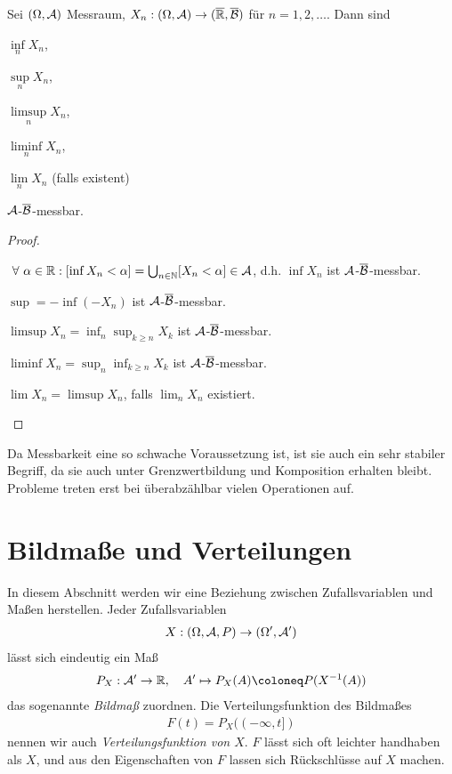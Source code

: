 \begin{prop}
\label{prop:3.7}
Sei  $(\Omega, \AA)$ Messraum, $X_{n} : (\Omega, \AA) \to
(\overline{\R}, \overline{\BB})$ für $n= 1,2, \ldots$.
Dann sind
\begin{defnpropenum}
  \item $\inf\limits_{n} X_{n}$,
  \item $\sup\limits_{n} X_{n}$,
  \item $\limsup\limits_{n} X_{n}$,
  \item $\liminf \limits_{n} X_{n}$,
  \item $\lim\limits_{n} X_{n}$ (falls existent)
\end{defnpropenum}
$\AA$-$\overline{\BB}$-messbar.\fishhere
\end{prop}
\begin{proof}
\begin{proofenumarabicbr}
  \item $\forall\alpha\in\R : [\inf X_n < \alpha] = \bigcup_{n\in\N} [X_n <
  \alpha] \in \AA$, d.h. $\inf X_n$ ist $\AA$-$\overline{\BB}$-messbar.
  \item $\sup=-\inf(-X_n)$ ist $\AA$-$\overline{\BB}$-messbar.
  \item $\limsup X_n = \inf_n \sup_{k\ge n} X_k$ 
 ist $\AA$-$\overline{\BB}$-messbar.
 \item $\liminf X_n = \sup_n \inf_{k\ge n} X_k$ ist
 $\AA$-$\overline{\BB}$-messbar.
 \item $\lim X_n = \limsup X_n$, falls $\lim_n X_n$ existiert.\qedhere
\end{proofenumarabicbr}
\end{proof}

Da Messbarkeit eine so schwache Voraussetzung ist, ist sie auch ein sehr
stabiler Begriff, da sie auch unter Grenzwertbildung und Komposition erhalten
bleibt. Probleme treten erst bei überabzählbar vielen Operationen auf.

\clearpage
\section{Bildmaße und Verteilungen}

In diesem Abschnitt werden wir eine Beziehung zwischen
Zufallsvariablen und Maßen herstellen. Jeder Zufallsvariablen
\begin{align*}
X:(\Omega,\AA,P)\to (\Omega',\AA')
\end{align*}
lässt sich eindeutig ein Maß
\begin{align*}
P_X : \AA' \to \R,\quad A'\mapsto P_X(A) \defl P(X^{-1}(A)) 
\end{align*}
das sogenannte \emph{Bildmaß} zuordnen. Die Verteilungsfunktion des
Bildmaßes
\begin{align*}
F(t) = P_X((-\infty,t])
\end{align*}
nennen wir auch \emph{Verteilungsfunktion von $X$}. $F$ lässt sich oft leichter
handhaben als $X$, und aus den Eigenschaften von $F$ lassen sich Rückschlüsse
auf $X$ machen.

